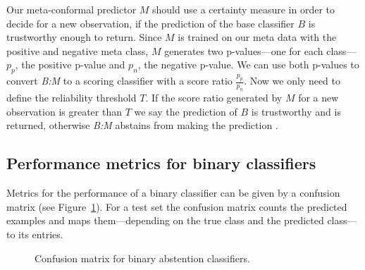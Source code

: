\documentclass[twoside,11pt]{article}
\begin{document}
Our meta-conformal predictor $M$ should use a certainty
measure in order to decide for a new observation, if the
prediction of the base classifier $B$ is trustworthy enough
to return. Since $M$ is trained on our meta data with the
positive and negative meta class, $M$ generates two
p-values---one for each class---$p_p$, the positive p-value
and $p_n$, the negative p-value.
We can use both p-values to convert \textit{B:M} to a
scoring classifier with a score ratio $\frac{p_p}{p_n}$.
Now we only need to define the reliability threshold $T$.
If the score ratio generated by $M$ for a new observation
is greater than $T$ we say the prediction of $B$ is
trustworthy and is returned, otherwise \textit{B:M}
abstains from making the prediction
\citep[see][]{smirnov_et_al_2009}.

\subsection*{Performance metrics for binary classifiers}

Metrics for the performance of a binary classifier can
be given by a confusion matrix (see Figure~\ref{fig:cm}).
For a test set the confusion matrix counts the predicted
examples and maps them---depending on the true class and
the predicted class---to its entries.

\begin{figure}
\begin{center}
\caption{Confusion matrix for binary abstention
         classifiers.}
\label{fig:cm}
\end{center}
\end{figure}
\end{document}
